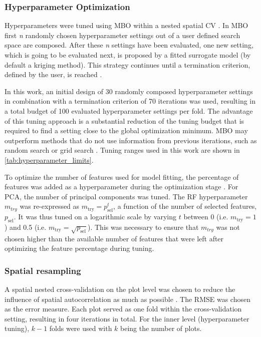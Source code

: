\documentclass[remotesensing,article,submit,moreauthors,pdftex]{Definitions/mdpi}
\begin{document}
\subsubsection{Hyperparameter Optimization}

Hyperparameters were tuned using \ac{MBO} within a nested spatial \ac{CV} \cite{mlrmbo, binder2020, schratz2019}.
In MBO first \textit{n} randomly chosen hyperparameter settings out of a user defined search space are composed.
After these \textit{n} settings have been evaluated, one new setting, which is going to be evaluated next, is proposed by a fitted surrogate model (by default a kriging method).
This strategy continues until a termination criterion, defined by the user, is reached \cite{hutter2011, jones1998}.

In this work, an initial design of 30 randomly composed hyperparameter settings in combination with a termination criterion of 70 iterations was used, resulting in a total budget of 100 evaluated hyperparameter settings per fold.
The advantage of this tuning approach is a substantial reduction of the tuning budget that is required to find a setting close to the global optimization minimum.
\ac{MBO} may outperform methods that do not use information from previous iterations, such as random search or grid search \cite{bergstra2012}.
Tuning ranges used in this work are shown in \autoref{tab:hyperparameter_limits}.

To optimize the number of features used for model fitting, the percentage of features was added as a hyperparameter during the optimization stage \cite{binder2020}.
For \ac{PCA}, the number of principal components was tuned.
The RF hyperparameter \texttt{\(m_{try}\)} was re-expressed as $m_\textrm{try} = p_\textrm{sel}^t$, a function of the number of selected features, $p_\textrm{sel}$.
It was thus tuned on a logarithmic scale by varying $t$ between 0 (i.e. $m_\textrm{try} = 1$) and 0.5 (i.e. $m_\textrm{try}=\sqrt{p_\textrm{sel}}$).
This was necessary to ensure that \texttt{\(m_{try}\)} was not chosen higher than the available number of features that were left after optimizing the feature percentage during tuning.

\subsubsection{Spatial resampling}

A spatial nested cross-validation on the plot level was chosen to reduce the influence of spatial autocorrelation as much as possible \cite{schratz2019, sperrorest}.
The \ac{RMSE} was chosen as the error measure.
Each plot served as one fold within the cross-validation setting, resulting in four iterations in total.
For the inner level (hyperparameter tuning), \(k - 1\) folds were used with \(k\) being the number of plots.
\end{document}
